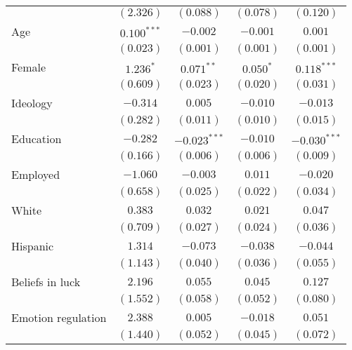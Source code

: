 \begin{table}[!t]
\begin{center}
{\begin{threeparttable}
\begin{tabular}{l c c c c}
                            & $(2.326)$      & $(0.088)$      & $(0.078)$     & $(0.120)$      \\
Age                         & $0.100^{***}$  & $-0.002$       & $-0.001$      & $0.001$        \\
                            & $(0.023)$      & $(0.001)$      & $(0.001)$     & $(0.001)$      \\
Female                      & $1.236^{*}$    & $0.071^{**}$   & $0.050^{*}$   & $0.118^{***}$  \\
                            & $(0.609)$      & $(0.023)$      & $(0.020)$     & $(0.031)$      \\
Ideology                    & $-0.314$       & $0.005$        & $-0.010$      & $-0.013$       \\
                            & $(0.282)$      & $(0.011)$      & $(0.010)$     & $(0.015)$      \\
Education                   & $-0.282$       & $-0.023^{***}$ & $-0.010$      & $-0.030^{***}$ \\
                            & $(0.166)$      & $(0.006)$      & $(0.006)$     & $(0.009)$      \\
Employed                    & $-1.060$       & $-0.003$       & $0.011$       & $-0.020$       \\
                            & $(0.658)$      & $(0.025)$      & $(0.022)$     & $(0.034)$      \\
White                       & $0.383$        & $0.032$        & $0.021$       & $0.047$        \\
                            & $(0.709)$      & $(0.027)$      & $(0.024)$     & $(0.036)$      \\
Hispanic                    & $1.314$        & $-0.073$       & $-0.038$      & $-0.044$       \\
                            & $(1.143)$      & $(0.040)$      & $(0.036)$     & $(0.055)$      \\
Beliefs in luck             & $2.196$        & $0.055$        & $0.045$       & $0.127$        \\
                            & $(1.552)$      & $(0.058)$      & $(0.052)$     & $(0.080)$      \\
Emotion regulation          & $2.388$        & $0.005$        & $-0.018$      & $0.051$        \\
                            & $(1.440)$      & $(0.052)$      & $(0.045)$     & $(0.072)$      \\

\end{tabular}
\end{threeparttable}}
\end{center}
\end{table}
